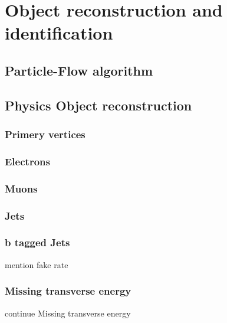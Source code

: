 \chapter{Object reconstruction and identification}
\section{Particle-Flow algorithm}
\newpage
\section{Physics Object reconstruction}
\subsection{Primery vertices}
\newpage
\subsection{Electrons}
\newpage
\subsection{Muons}
\newpage
\subsection{Jets}
\subsection{b tagged Jets}
mention fake rate 
\newpage
\subsection{Missing transverse energy}
\newpage
continue Missing transverse energy
\newpage
